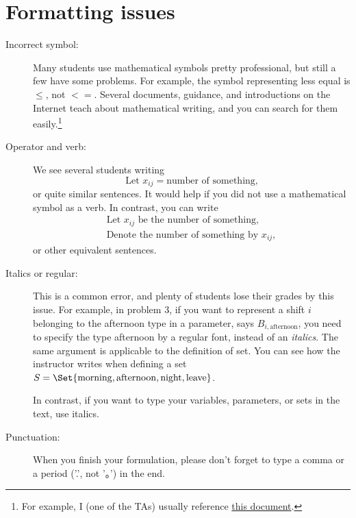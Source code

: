 \documentclass{OR_SolutionTheme}
\begin{document}
\section{Formatting issues}\label{sec:format}
\begin{description}
    \item[Incorrect symbol:]
    Many students use mathematical symbols pretty professional, but still a few have some 
    problems. For example, the symbol representing less equal is $\leq$, not $<=$. 
    Several documents, guidance, and introductions on the Internet teach about mathematical writing,
    and you can search for them easily.\footnote{For example, I (one of the TAs) usually reference
    \href{https://www.caam.rice.edu/~heinken/latex/symbols.pdf}{this document}.}
    
    \item[Operator and verb:]
    We see several students writing 
    \[
        \text{Let } x_{ij} = \text{number of something,}
    \]
    or quite similar sentences. 
    It would help if you did not use a mathematical symbol as a verb.
    In contrast, you can write
    \[
        \begin{array}{C}
            \text{Let } x_{ij} \text{ be the number of something,} \\
            \text{Denote the number of something by } x_{ij}, 
        \end{array}
    \]
    or other equivalent sentences.
    
    \item[Italics or regular:]
    This is a common error, and plenty of students lose their grades
    by this issue.
    For example, in problem 3, if you want to 
    represent a shift $i$ belonging to the afternoon type in a parameter, 
    says $B_{i,\mathrm{afternoon}}$, you need to specify the type afternoon by
    a regular font, instead of an {\it italics}. The same argument is applicable to
    the definition of set. You can see how the 
    instructor writes when defining a set $S=\Set{\mathrm{morning, afternoon, night, leave}}$.
    
    In contrast, if you want to type
    your variables, parameters, or sets in the
    text, use italics.
    
    \item[Punctuation:]
    When you finish your formulation, please don't forget
    to type a comma or a period ('.', not '。') in the end.
    
\end{description}
\end{document}
